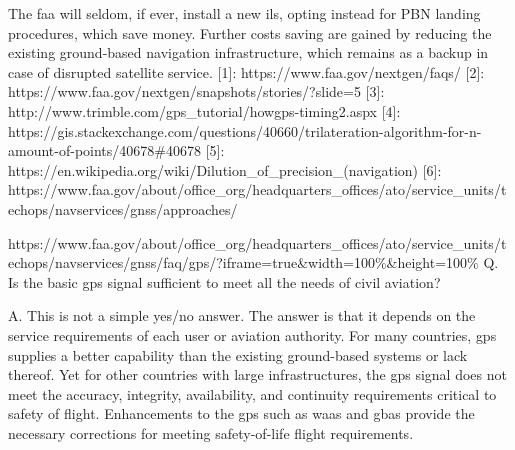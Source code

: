 The \ac{faa} will seldom, if ever, install a new \ac{ils}, opting instead for PBN
landing procedures, which save money. Further costs saving are gained by
reducing the existing ground-based navigation infrastructure, which
remains as a backup in case of disrupted satellite service. {[}1{]}:
https://www.faa.gov/nextgen/faqs/ {[}2{]}:
https://www.faa.gov/nextgen/snapshots/stories/?slide=5 {[}3{]}:
http://www.trimble.com/gps\_tutorial/howgps-timing2.aspx {[}4{]}:
https://gis.stackexchange.com/questions/40660/trilateration-algorithm-for-n-amount-of-points/40678\#40678
{[}5{]}:
https://en.wikipedia.org/wiki/Dilution\_of\_precision\_(navigation)
{[}6{]}:
https://www.faa.gov/about/office\_org/headquarters\_offices/ato/service\_units/techops/navservices/gnss/approaches/

https://www.faa.gov/about/office\_org/headquarters\_offices/ato/service\_units/techops/navservices/gnss/faq/gps/?iframe=true\&width=100\%\&height=100\%
Q. Is the basic \ac{gps} signal sufficient to meet all the needs of civil aviation?

A. This is not a simple yes/no answer. The answer is that it depends on
the service requirements of each user or aviation authority. For many
countries, \ac{gps} supplies a better capability than the existing
ground-based systems or lack thereof. Yet for other countries with large
infrastructures, the \ac{gps} signal does not meet the accuracy, integrity,
availability, and continuity requirements critical to safety of flight.
Enhancements to the \ac{gps} such as \ac{waas} and \ac{gbas} provide the necessary corrections for meeting safety-of-life flight requirements.

